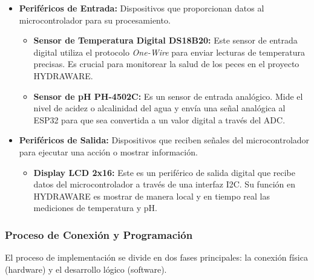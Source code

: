 \documentclass[a4paper,12pt]{article}
\begin{document}
	\begin{itemize}
		\item \textbf{Periféricos de Entrada:} Dispositivos que proporcionan datos al microcontrolador para su procesamiento.
		\begin{itemize}
			\item \textbf{Sensor de Temperatura Digital DS18B20:} Este sensor de entrada digital utiliza el protocolo \textit{One-Wire} para enviar lecturas de temperatura precisas. Es crucial para monitorear la salud de los peces en el proyecto HYDRAWARE.
			\item \textbf{Sensor de pH PH-4502C:} Es un sensor de entrada analógico. Mide el nivel de acidez o alcalinidad del agua y envía una señal analógica al ESP32 para que sea convertida a un valor digital a través del ADC.
		\end{itemize}
		\item \textbf{Periféricos de Salida:} Dispositivos que reciben señales del microcontrolador para ejecutar una acción o mostrar información.
		\begin{itemize}
			\item \textbf{Display LCD 2x16:} Este es un periférico de salida digital que recibe datos del microcontrolador a través de una interfaz I2C. Su función en HYDRAWARE es mostrar de manera local y en tiempo real las mediciones de temperatura y pH.
		\end{itemize}
	\end{itemize}
	
	\subsubsection{Proceso de Conexión y Programación}
	El proceso de implementación se divide en dos fases principales: la conexión física (hardware) y el desarrollo lógico (software).
	
\end{document}
